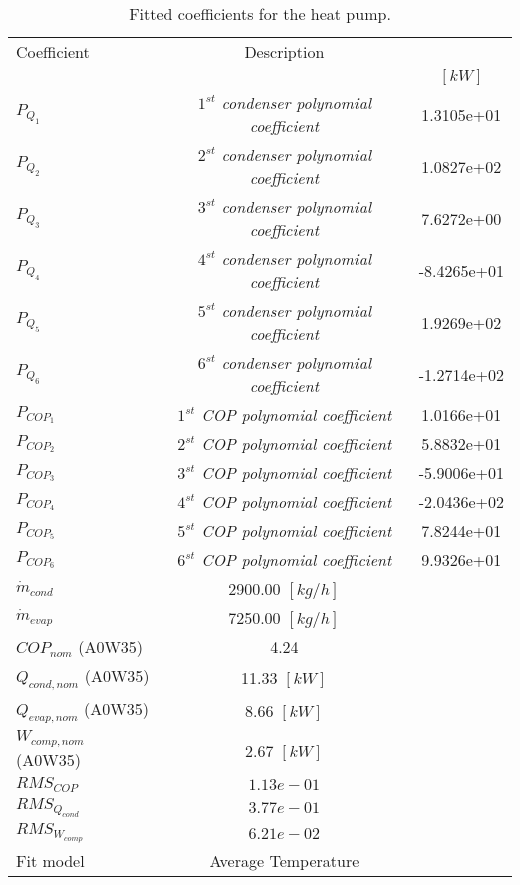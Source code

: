 \documentclass[english]{SPFShortReport}
\author{Dani Carbonell}
\begin{document}
\begin{table}[!ht]
\begin{small}
\caption{Fitted coefficients for the heat pump.}
\begin{center}
\resizebox{12cm}{!} 
{
\begin{tabular}{l | c c } 
\hline
\hline
Coefficient &Description & \\ 
 & &$[kW]$\\ 
\hline
$P_{Q_{1}}$ & \emph{$1^{st}$ condenser polynomial coefficient}  & 1.3105e+01    \\ 
$P_{Q_{2}}$ & \emph{$2^{st}$ condenser polynomial coefficient}  & 1.0827e+02    \\ 
$P_{Q_{3}}$ & \emph{$3^{st}$ condenser polynomial coefficient}  & 7.6272e+00    \\ 
$P_{Q_{4}}$ & \emph{$4^{st}$ condenser polynomial coefficient}  & -8.4265e+01    \\ 
$P_{Q_{5}}$ & \emph{$5^{st}$ condenser polynomial coefficient}  & 1.9269e+02    \\ 
$P_{Q_{6}}$ & \emph{$6^{st}$ condenser polynomial coefficient}  & -1.2714e+02    \\ 
\hline
$P_{COP_{1}}$ & \emph{$1^{st}$ COP polynomial coefficient}  & 1.0166e+01    \\ 
$P_{COP_{2}}$ & \emph{$2^{st}$ COP polynomial coefficient}  & 5.8832e+01    \\ 
$P_{COP_{3}}$ & \emph{$3^{st}$ COP polynomial coefficient}  & -5.9006e+01    \\ 
$P_{COP_{4}}$ & \emph{$4^{st}$ COP polynomial coefficient}  & -2.0436e+02    \\ 
$P_{COP_{5}}$ & \emph{$5^{st}$ COP polynomial coefficient}  & 7.8244e+01    \\ 
$P_{COP_{6}}$ & \emph{$6^{st}$ COP polynomial coefficient}  & 9.9326e+01    \\ 
\hline
$\dot m_{cond}$ & 2900.00 $[kg/h]$ \\ 
$\dot m_{evap}$ & 7250.00 $[kg/h]$ \\ 
\hline
$COP_{nom}$ (A0W35)& 4.24 \\ 
$Q_{cond,nom}$ (A0W35)& 11.33 $[kW]$\\ 
$Q_{evap,nom}$ (A0W35)& 8.66 $[kW]$\\ 
$W_{comp,nom}$ (A0W35)& 2.67 $[kW]$\\ 
\hline
 $RMS_{COP}$ & $1.13e-01$ \\ 
 $RMS_{Q_{cond}}$ & $3.77e-01$ \\ 
 $RMS_{W_{comp}}$ & $6.21e-02$ \\ 
\hline
Fit model & Average Temperature\\ 
\hline
\hline
\end{tabular}
}
\label{CoefTable}
\end{center}
\end{small}
\end{table}
\end{document}
